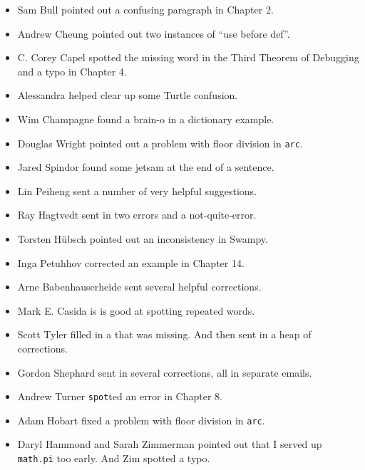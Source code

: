 \begin{itemize}
\item Sam Bull pointed out a confusing paragraph in Chapter 2.

\item Andrew Cheung pointed out two instances of ``use before def''.

\item C. Corey Capel spotted the missing word in the Third Theorem
of Debugging and a typo in Chapter 4.

\item Alessandra helped clear up some Turtle confusion.

\item Wim Champagne found a brain-o in a dictionary example.

\item Douglas Wright pointed out a problem with floor division in
\texttt{arc}.

\item Jared Spindor found some jetsam at the end of a sentence.

\item Lin Peiheng sent a number of very helpful suggestions.

\item Ray Hagtvedt sent in two errors and a not-quite-error.

\item Torsten H\"{u}bsch pointed out an inconsistency in Swampy.

\item Inga Petuhhov corrected an example in Chapter 14.

\item Arne Babenhauserheide sent several helpful corrections.

\item Mark E. Casida is is good at spotting repeated words.

\item Scott Tyler filled in a that was missing.  And then sent in
a heap of corrections.

\item Gordon Shephard sent in several corrections, all in separate
emails.

\item Andrew Turner \texttt{spot}ted an error in Chapter 8.

\item Adam Hobart fixed a problem with floor division in \texttt{arc}.

\item Daryl Hammond and Sarah Zimmerman pointed out that I served
up \texttt{math.pi} too early.  And Zim spotted a typo.


\end{itemize}
